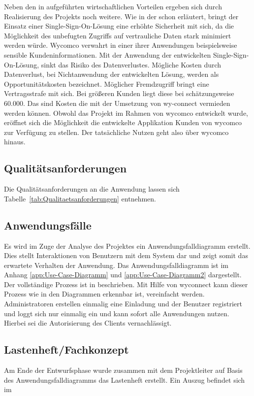 Neben den in  aufgeführten wirtschaftlichen Vorteilen ergeben sich durch Realisierung des Projekts noch weitere.
Wie in der  schon erläutert, bringt der Einsatz einer Single-Sign-On-Lösung eine erhöhte Sicherheit mit sich, da die Möglichkeit des unbefugten Zugriffs auf vertrauliche Daten stark minimiert werden würde. Wycomco verwahrt in einer ihrer Anwendungen beispielsweise sensible Kundeninformationen. Mit der Anwendung der entwickelten Single-Sign-On-Lösung, sinkt das Risiko des Datenverlustes. Mögliche Kosten durch Datenverlust, bei Nichtanwendung der entwickelten Lösung, werden als  Opportunitätskosten bezeichnet. Möglicher Fremdzugriff bringt eine Vertragsstrafe mit sich. Bei größeren Kunden liegt diese bei schätzungsweise 60.000\eur{}. Das sind Kosten die mit der Umsetzung von wy-connect vermieden werden können. 
Obwohl das Projekt im Rahmen von wycomco entwickelt wurde, eröffnet sich die Möglichkeit die entwickelte Applikation  Kunden von wycomco zur Verfügung zu stellen. Der tatsächliche Nutzen geht also über wycomco hinaus.

\subsection{Qualitätsanforderungen}
\label{sec:Qualitaetsanforderungen}

Die Qualitätsanforderungen an die Anwendung lassen sich Tabelle~\ref{tab:Qualitaetsanforderungen} entnehmen.

\subsection{Anwendungsfälle}
\label{sec:Anwendungsfaelle}

Es wird im Zuge der Analyse des Projektes ein Anwendungsfalldiagramm erstellt. Dies stellt Interaktionen von Benutzern mit dem System dar und zeigt somit das erwartete Verhalten der Anwendung. Das Anwendungsfalldiagramm ist im Anhang \ref{app:Use-Case-Diagramm} und \ref{app:Use-Case-Diagramm2} dargestellt.
Der vollständige Prozess ist in  beschrieben.
Mit Hilfe von wyconnect kann dieser Prozess wie in den Diagrammen erkennbar ist, vereinfacht werden. Administratoren erstellen einmalig eine Einladung und der Benutzer registriert und loggt sich nur einmalig ein und kann sofort alle Anwendungen nutzen. Hierbei sei die Autorisierung des Clients vernachlässigt. 

\subsection{Lastenheft/Fachkonzept}
\label{sec:Lastenheft}
Am Ende der Entwurfsphase wurde zusammen mit dem Projektleiter auf Basis des Anwendungsfalldiagramms das Lastenheft erstellt. Ein Auszug befindet sich im 
